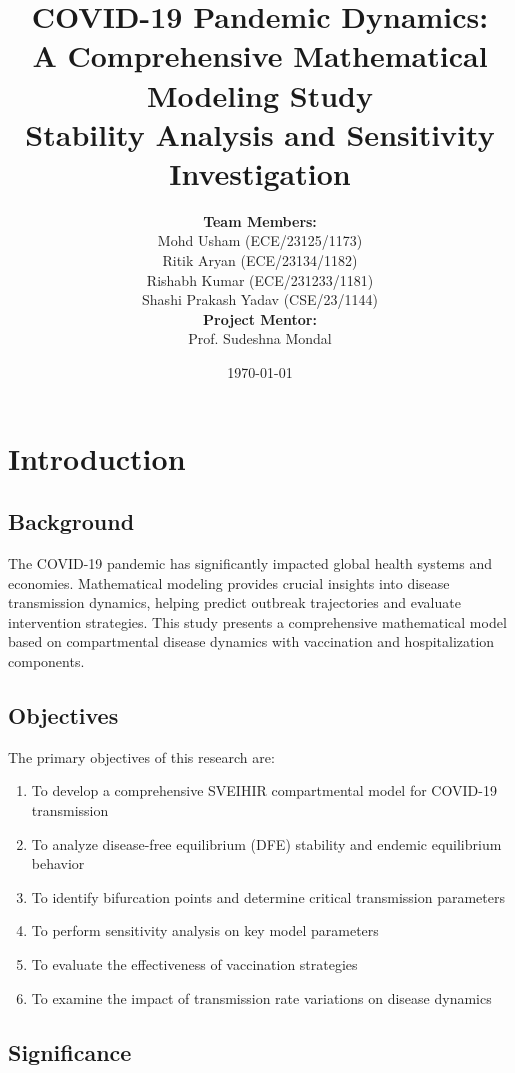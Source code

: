 \documentclass[12pt,a4paper]{report}
\title{
    \textbf{\Large COVID-19 Pandemic Dynamics: \\
    A Comprehensive Mathematical Modeling Study}
    \\ \vspace{0.5cm}
    \large Stability Analysis and Sensitivity Investigation
}
\author{
    \textbf{Team Members:} \\[0.3cm]
    Mohd Usham (ECE/23125/1173) \\
    Ritik Aryan (ECE/23134/1182) \\
    Rishabh Kumar (ECE/231233/1181) \\
    Shashi Prakash Yadav (CSE/23/1144) \\[0.5cm]
    \textbf{Project Mentor:} \\[0.3cm]
    Prof. Sudeshna Mondal
}
\date{\today}
\begin{document}
\maketitle

\newpage
\tableofcontents
\newpage

\chapter{Introduction}

\section{Background}

The COVID-19 pandemic has significantly impacted global health systems and economies. Mathematical modeling provides crucial insights into disease transmission dynamics, helping predict outbreak trajectories and evaluate intervention strategies. This study presents a comprehensive mathematical model based on compartmental disease dynamics with vaccination and hospitalization components.

\section{Objectives}

The primary objectives of this research are:

\begin{enumerate}
    \item To develop a comprehensive SVEIHIR compartmental model for COVID-19 transmission
    \item To analyze disease-free equilibrium (DFE) stability and endemic equilibrium behavior
    \item To identify bifurcation points and determine critical transmission parameters
    \item To perform sensitivity analysis on key model parameters
    \item To evaluate the effectiveness of vaccination strategies
    \item To examine the impact of transmission rate variations on disease dynamics
\end{enumerate}

\section{Significance}
\end{document}
